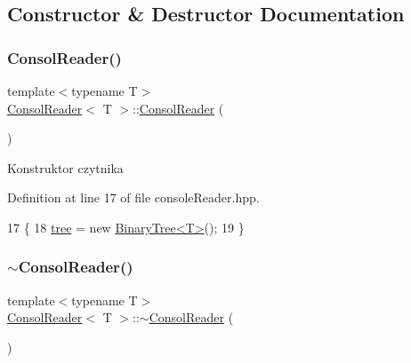\subsection{Constructor \& Destructor Documentation}
\mbox{\label{classConsolReader_ac922e2362abb36d6a2675a1580a36f82}} 
\subsubsection{\texorpdfstring{Consol\+Reader()}{ConsolReader()}}
{\footnotesize\ttfamily template$<$typename T$>$ \\
\hyperlink{classConsolReader}{Consol\+Reader}$<$ T $>$\+::\hyperlink{classConsolReader}{Consol\+Reader} (\begin{DoxyParamCaption}{ }\end{DoxyParamCaption})\hspace{0.3cm}{\ttfamily [inline]}}

Konstruktor czytnika 

Definition at line 17 of file console\+Reader.\+hpp.


\begin{DoxyCode}
17                        \{
18             \hyperlink{classConsolReader_a11228c385559fb0f4379b5f0c4fadef5}{tree} = \textcolor{keyword}{new} \hyperlink{classBinaryTree}{BinaryTree<T>}();
19         \}
\end{DoxyCode}
\mbox{\label{classConsolReader_aeb98e5b65c25b0a96ba7094cbe69add3}} 
\subsubsection{\texorpdfstring{$\sim$\+Consol\+Reader()}{~ConsolReader()}}
{\footnotesize\ttfamily template$<$typename T$>$ \\
\hyperlink{classConsolReader}{Consol\+Reader}$<$ T $>$\+::$\sim$\hyperlink{classConsolReader}{Consol\+Reader} (\begin{DoxyParamCaption}{ }\end{DoxyParamCaption})\hspace{0.3cm}{\ttfamily [inline]}}

